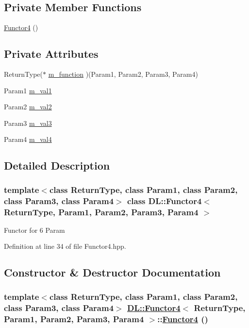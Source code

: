 \subsection*{Private Member Functions}
\begin{CompactItemize}
\item 
\hyperlink{classDL_1_1Functor4_d0}{Functor4} ()
\end{CompactItemize}
\subsection*{Private Attributes}
\begin{CompactItemize}
\item 
Return\-Type($\ast$ \hyperlink{classDL_1_1Functor4_r0}{m\_\-function} )(Param1, Param2, Param3, Param4)
\item 
Param1 \hyperlink{classDL_1_1Functor4_r1}{m\_\-val1}
\item 
Param2 \hyperlink{classDL_1_1Functor4_r2}{m\_\-val2}
\item 
Param3 \hyperlink{classDL_1_1Functor4_r3}{m\_\-val3}
\item 
Param4 \hyperlink{classDL_1_1Functor4_r4}{m\_\-val4}
\end{CompactItemize}


\subsection{Detailed Description}
\subsubsection*{template$<$class Return\-Type, class Param1, class Param2, class Param3, class Param4$>$ class DL::Functor4$<$ Return\-Type, Param1, Param2, Param3, Param4 $>$}

Functor for 6 Param



Definition at line 34 of file Functor4.hpp.

\subsection{Constructor \& Destructor Documentation}
\hypertarget{classDL_1_1Functor4_d0}{
\subsubsection[Functor4]{\setlength{\rightskip}{0pt plus 5cm}template$<$class Return\-Type, class Param1, class Param2, class Param3, class Param4$>$ \hyperlink{classDL_1_1Functor4}{DL::Functor4}$<$ Return\-Type, Param1, Param2, Param3, Param4 $>$::\hyperlink{classDL_1_1Functor4}{Functor4} ()}}
\label{classDL_1_1Functor4_d0}




